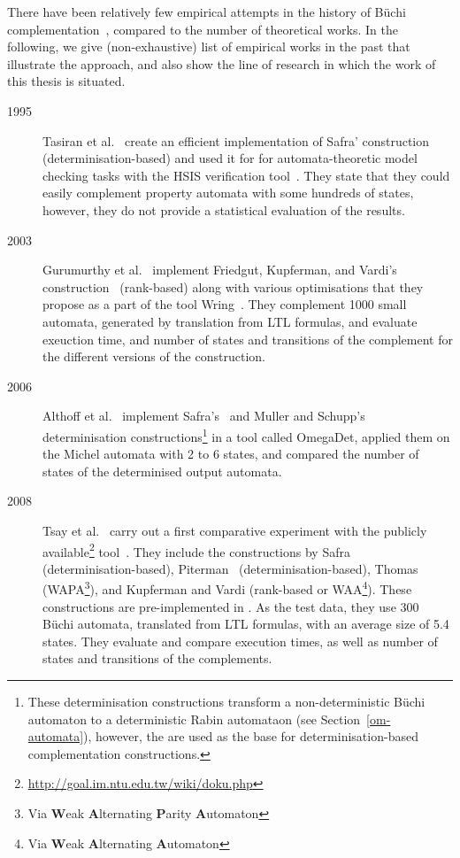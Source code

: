 There have been relatively few empirical attempts in the history of Büchi complementation~\cite{2011_tsai}, compared to the number of theoretical works. In the following, we give  (non-exhaustive) list of empirical works in the past that illustrate the approach, and also show the line of research in which the work of this thesis is situated.

\begin{description}
\item[1995] Tasiran et al.~\cite{1995_tasiran} create an efficient implementation of Safra' construction\cite{1988_safra_2} (determinisation-based) and used it for for automata-theoretic model checking tasks with the HSIS verification tool~\cite{1994_hsis}. They state that they could easily complement property automata with some hundreds of states, however, they do not provide a statistical evaluation of the results.

\item[2003] Gurumurthy et al.~\cite{2003_Gurumurthy} implement Friedgut, Kupferman, and Vardi's construction~\cite{Kupferman:2001} (rank-based) along with various optimisations that they propose as a part of the tool Wring~\cite{somenzi2000efficient}. They complement 1000 small automata, generated by translation from LTL formulas, and evaluate exeuction time, and number of states and transitions of the complement for the different versions of the construction.

\item[2006] Althoff et al.~\cite{2006_althoff} implement Safra's~\cite{1988_safra_2} and Muller and Schupp's~\cite{Muller199569} determinisation constructions\footnote{These determinisation constructions transform a non-deterministic Büchi automaton to a deterministic Rabin automataon (see Section~\ref{om-automata}), however, the are used as the base for determinisation-based complementation constructions.} in a tool called OmegaDet, applied them on the Michel automata with 2 to 6 states, and compared the number of states of the determinised output automata.

\item[2008] Tsay et al.~\cite{2008_goal_ext} carry out a first comparative experiment with the publicly available\footnote{\url{http://goal.im.ntu.edu.tw/wiki/doku.php}} \goal{} tool~\cite{2007_goal}\cite{2008_goal_ext}\cite{2009_goal}\cite{2013_goal}. They include the constructions by Safra~\cite{1988_safra_2} (determinisation-based), Piterman~\cite{2007_piterman} (determinisation-based), Thomas~\cite{1999_thomas} (WAPA\footnote{Via \textbf{W}eak \textbf{A}lternating \textbf{P}arity \textbf{A}utomaton}), and Kupferman and Vardi\cite{Kupferman:2001} (rank-based or WAA\footnote{Via \textbf{W}eak \textbf{A}lternating \textbf{A}utomaton}). These constructions are pre-implemented in \goal. As the test data, they use 300 Büchi automata, translated from LTL formulas, with an average size of 5.4 states. They evaluate and compare execution times, as well as number of states and transitions of the complements.


\end{description}
